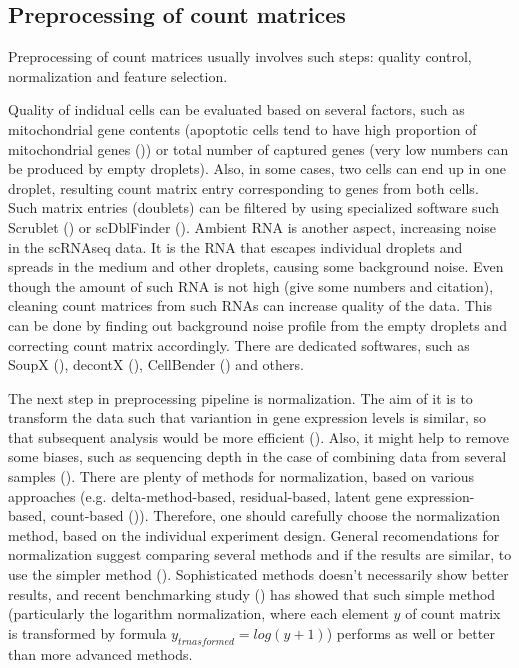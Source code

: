 \subsection{Preprocessing of count matrices}

Preprocessing of count matrices usually involves such steps:
quality control, normalization and feature selection.

Quality of indidual cells can be evaluated based on several factors, such as mitochondrial gene contents
(apoptotic cells tend to have high proportion of mitochondrial genes (\cite{Heumos2023})) or
total number of captured genes (very low numbers can be produced by empty droplets).
Also, in some cases, two cells can end up in one droplet,
resulting count matrix entry corresponding to genes from  both cells.
Such matrix entries (doublets) can be filtered by using specialized software
such Scrublet (\cite{Wolock2019}) or scDblFinder (\cite{Germain2022}).
Ambient RNA is another aspect, increasing noise in the scRNAseq data.
It is the RNA that escapes individual droplets and spreads in the medium and other droplets,
causing some background noise.
Even though the amount of such RNA is not high (give some numbers and citation),
cleaning count matrices from such RNAs can increase quality of the data.
This can be done by finding out background noise profile from the empty droplets and correcting count matrix accordingly.
There are dedicated softwares,
such as SoupX (\cite{Young2020}), decontX (\cite{Yang2020}), CellBender (\cite{Fleming2023}) and others.

The next step in preprocessing pipeline is normalization.
The aim of it is to transform the data such that variantion in gene expression levels is similar,
so that subsequent analysis would be more efficient (\cite{Ahlmann2023}).
Also, it might help to remove some biases,
such as sequencing depth in the case of combining data from several samples (\cite{Lingen2024}).
There are plenty of methods for normalization, based on various approaches
(e.g. delta-method-based, residual-based, latent gene expression-based, count-based (\cite{Ahlmann2023})).
Therefore, one should carefully choose the normalization method, based on the individual experiment design.
General recomendations for normalization suggest comparing several methods and if the results are similar,
to use the simpler method (\cite{Lingen2024}).
Sophisticated methods doesn't necessarily show better results, and recent benchmarking study (\cite{Ahlmann2023})
has showed that such simple method (particularly the logarithm normalization,
where each element $y$ of count matrix is transformed by formula $y_{trnasformed} = log(y+1)$)
performs as well or better than more advanced methods.

